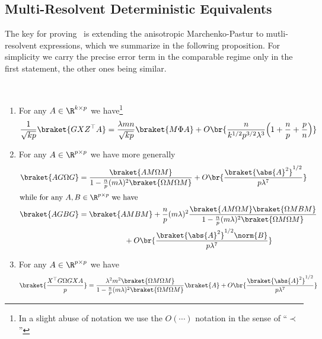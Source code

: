 \subsection*{Multi-Resolvent Deterministic Equivalents}
The key for proving~ is extending the anisotropic Marchenko-Pastur to mutli-resolvent expressions, which we summarize in the following proposition. For simplicity we carry the precise error term in the comparable regime only in the first statement, the other ones being similar. 
\begin{proposition}\label{prop multi res}~
    \begin{enumerate}
        \item\label{GXZ} For any $A\in\R^{k\times p}$ we have\footnote{In a slight abuse of notation we use the $O(\cdots)$ notation in the sense of ``$\prec$''}
        \begin{equation}
            \frac{1}{\sqrt{kp}} \braket{GXZ^\top A} =\frac{\lambda m n}{\sqrt{kp}}\braket{M\Phi A} + O\br{\frac{n}{k^{1/2}p^{3/2}\lambda^3}\Bigl(1+\frac{n}{p}+\frac{p}{n}\Bigr)}
        \end{equation}
        \item\label{GOmG} For any $A\in\R^{p\times p}$ we have more generally
        \begin{subequations}
            \begin{align}
                \braket{A G \Omega G} & = \frac{\braket{ AM \Omega M}}{1- \frac{n}{p}(m\lambda)^2 \braket{\Omega M \Omega M}} + O\br{\frac{\braket{\abs{A}^2}^{1/2}}{p\lambda^7}}                                                                         \\
                \intertext{while for any $A,B\in\R^{p\times p}$ we have}
                \braket{A G B G}      & = \braket{ AM B M} + \frac{n}{p}(m\lambda)^2 \frac{\braket{ AM \Omega M}\braket{\Omega M B M}}{1- \frac{n}{p}(m\lambda)^2 \braket{\Omega M \Omega M}} \\
                &\qquad \qquad \qquad + O\br{\frac{\braket{\abs{A}^2}^{1/2}\norm{B}}{p\lambda^7}}
            \end{align}
        \end{subequations}
        \item\label{XGomXG} For any $A\in\R^{p\times p}$ we have
        \begin{equation}
            \braket{\frac{X^\top G\Omega GX A}{p}} =  \frac{\lambda^2m^2  \braket{ \Omega M \Omega M}}{1- \frac{n}{p}(m\lambda)^2 \braket{\Omega M \Omega M}}\braket{A} + O\br{\frac{\braket{\abs{A}^2}^{1/2}}{p\lambda^7}}

\end{equation}
\end{enumerate}
\end{proposition}
